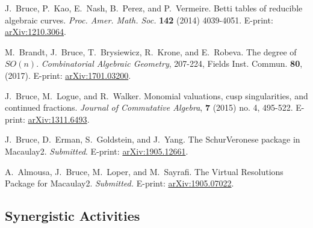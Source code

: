 \documentclass[svgnames,11pt]{article}
\begin{document}
\begin{bibenum}[itemsep=5pt]
\item
	J.~Bruce, P.~Kao, E.~Nash, B.~Perez, and P.~Vermeire. Betti tables of reducible algebraic curves. {\it Proc. Amer. Math. Soc.} \textbf{142} (2014) 4039-4051. E-print: \hyperref{http://arxiv.org/abs/1210.3064}{}{}{arXiv:1210.3064}.

\item
	M.~Brandt, J.~Bruce, T.~Brysiewicz, R.~Krone, and E.~Robeva. The degree of $SO(n)$. {\it Combinatorial Algebraic Geometry}, 207-224, Fields Inst. Commun. \textbf{80}, (2017). E-print: \hyperref{https://arxiv.org/abs/1701.03200}{}{}{arXiv:1701.03200}.
	
\item
	J.~Bruce, M.~Logue, and R.~Walker. Monomial valuations, cusp singularities, and continued fractions. {\it Journal of Commutative Algebra}, \textbf{7} (2015) no. 4, 495-522. E-print: \hyperref{http://arxiv.org/abs/1311.6493}{}{}{arXiv:1311.6493}.
	
\item
	J.~Bruce, D.~Erman, S.~Goldstein, and J.~Yang. The SchurVeronese package in Macaulay2.  {\it Submitted}. E-print: \hyperref{https://arxiv.org/abs/1905.12661}{}{}{arXiv:1905.12661}.
	
\item
	A.~Almousa, J.~Bruce, M.~Loper, and M.~Sayrafi. The Virtual Resolutions Package for Macaulay2.  {\it Submitted.} E-print: \hyperref{http://arxiv.org/abs/1905.07022}{}{}{arXiv:1905.07022}.
	
\end{bibenum}



\subsection{Synergistic Activities}
\end{document}
